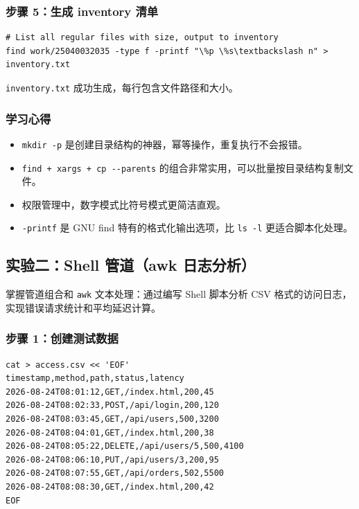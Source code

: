 \documentclass[12pt,a4paper]{article}
\begin{document}
\subsubsection{步骤 5：生成 inventory 清单}

\begin{lstlisting}[style=shellstyle, caption={Generate file inventory}]
# List all regular files with size, output to inventory
find work/25040032035 -type f -printf "\%p \%s\textbackslash n" > inventory.txt
\end{lstlisting}

\begin{resultbox}
\texttt{inventory.txt} 成功生成，每行包含文件路径和大小。
\end{resultbox}

\subsubsection{学习心得}

\begin{itemize}[leftmargin=2em]
    \item \texttt{mkdir -p} 是创建目录结构的神器，幂等操作，重复执行不会报错。
    \item \texttt{find + xargs + cp -\/-parents} 的组合非常实用，可以批量按目录结构复制文件。
    \item 权限管理中，数字模式比符号模式更简洁直观。
    \item \texttt{-printf} 是 GNU find 特有的格式化输出选项，比 \texttt{ls -l} 更适合脚本化处理。
\end{itemize}

\newpage
\subsection{实验二：Shell 管道（awk 日志分析）}

\begin{goalbox}
掌握管道组合和 \texttt{awk} 文本处理：通过编写 Shell 脚本分析 CSV 格式的访问日志，实现错误请求统计和平均延迟计算。
\end{goalbox}

\subsubsection{步骤 1：创建测试数据}

\begin{lstlisting}[style=shellstyle, caption={Create access.csv test data}]
cat > access.csv << 'EOF'
timestamp,method,path,status,latency
2026-08-24T08:01:12,GET,/index.html,200,45
2026-08-24T08:02:33,POST,/api/login,200,120
2026-08-24T08:03:45,GET,/api/users,500,3200
2026-08-24T08:04:01,GET,/index.html,200,38
2026-08-24T08:05:22,DELETE,/api/users/5,500,4100
2026-08-24T08:06:10,PUT,/api/users/3,200,95
2026-08-24T08:07:55,GET,/api/orders,502,5500
2026-08-24T08:08:30,GET,/index.html,200,42
EOF
\end{lstlisting}
\end{document}
